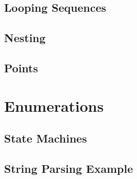 \subsection{Looping Sequences}

\subsection{Nesting}

\subsection{Points}

\section{Enumerations}

\subsection{State Machines}

\subsection{String Parsing Example}

